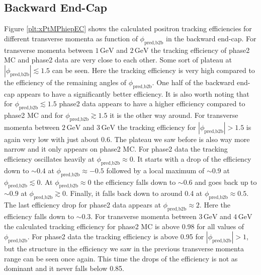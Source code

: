 \documentclass[a4paper,11pt,twosided,final,german,openbib,pdftex,listof=totoc,bibliography=totoc]{scrbook}
\begin{document}
\newpage

\subsection{Backward End-Cap}

Figure \ref{plt:xPtMPhiepEC} shows the calculated positron tracking efficiencies for different transverse momenta as function of $\phi_{\textrm{pred,b2b}}$ in the backward end-cap. 
For transverse momenta between $1\,\textrm{GeV}$ and $2\,\textrm{GeV}$ the tracking efficiency of phase2 MC and phase2 data are very close to each other. Some sort of plateau at $|\phi_{\textrm{pred,b2b}}| \lesssim 1.5$ can be seen. Here the tracking efficiency is very high compared to the efficiency of the remaining angles of $\phi_{\textrm{pred,b2b}}$. One half of the backward end-cap appears to have a significantly better efficiency. It is also worth noting that for $\phi_{\textrm{pred,b2b}} \lesssim 1.5$ phase2 data appears to have a higher efficiency compared to phase2 MC and for $\phi_{\textrm{pred,b2b}} \gtrsim 1.5$ it is the other way around. 
For transverse momenta between $2\,\textrm{GeV}$ and $3\,\textrm{GeV}$ the tracking efficiency for $|\phi_{\textrm{pred,b2b}}| >1.5$ is again very low with just about 0.6. The plateau we saw before is also way more narrow and it only appears on phase2 MC. For phase2 data the tracking efficiency oscillates heavily at $\phi_{\textrm{pred,b2b}} \approx 0$. It starts with a drop of the efficiency down to $\sim 0.4$ at $\phi_{\textrm{pred,b2b}} \approx -0.5$ followed by a local maximum of $\sim 0.9$ at $\phi_{\textrm{pred,b2b}} \lesssim 0$. At $\phi_{\textrm{pred,b2b}} \approx 0 $ the efficiency falls down to $\sim 0.6$ and goes back up to $\sim 0.9$ at $\phi_{\textrm{pred,b2b}} \gtrsim 0$. Finally, it falls back down to around 0.4 at $\phi_{\textrm{pred,b2b}} \approx 0.5$. The last efficiency drop for phase2 data appears at $\phi_{\textrm{pred,b2b}} \approx 2$. Here the efficiency falls down to $\sim 0.3$. 
For transverse momenta between $3\,\textrm{GeV}$ and $4\,\textrm{GeV}$ the calculated tracking efficiency for phase2 MC is above 0.98 for all values of $\phi_{\textrm{pred,b2b}}$. For phase2 data the tracking efficiency is above 0.95 for $|\phi_{\textrm{pred,b2b}}| > 1$, but the structure in the efficiency we saw in the previous transverse momenta range can be seen once again. This time the drops of the efficiency is not as dominant and it never falls below 0.85.
\end{document}
